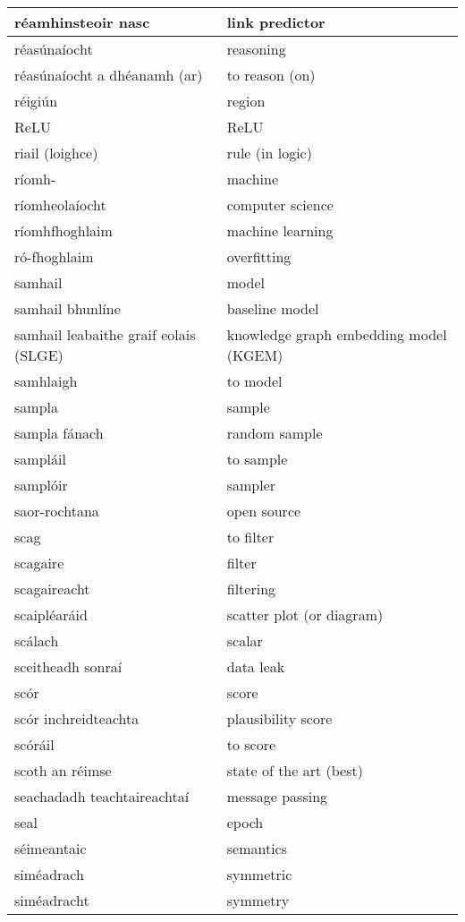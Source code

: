 \begin{longtable}{|l|l|}
		réamhinsteoir nasc&link predictor\\ \hline 
		réasúnaíocht&reasoning\\ \hline 
		réasúnaíocht a dhéanamh (ar)&to reason (on)\\ \hline 
		réigiún&region\\ \hline 
		ReLU&ReLU\\ \hline 
		riail (loighce)&rule (in logic)\\ \hline 
		ríomh-&machine\\ \hline 
		ríomheolaíocht&computer science\\ \hline 
		ríomhfhoghlaim&machine learning\\ \hline 
		ró-fhoghlaim&overfitting\\ \hline 
		samhail&model\\ \hline 
		samhail bhunlíne&baseline model\\ \hline 
		samhail leabaithe graif eolais (SLGE)&knowledge graph embedding model (KGEM)\\ \hline 
		samhlaigh&to model\\ \hline 
		sampla&sample\\ \hline 
		sampla fánach&random sample\\ \hline 
		sampláil&to sample\\ \hline 
		samplóir&sampler\\ \hline 
		saor-rochtana&open source\\ \hline 
		scag&to filter\\ \hline 
		scagaire&filter\\ \hline 
		scagaireacht&filtering\\ \hline 
		scaipléaráid&scatter plot (or diagram)\\ \hline 
		scálach&scalar\\ \hline 
		sceitheadh sonraí&data leak\\ \hline 
		scór&score\\ \hline 
		scór inchreidteachta&plausibility score\\ \hline 
		scóráil&to score\\ \hline 
		scoth an réimse&state of the art (best)\\ \hline 
		seachadadh teachtaireachtaí&message passing\\ \hline 
		seal&epoch\\ \hline 
		séimeantaic&semantics\\ \hline 
		siméadrach&symmetric\\ \hline 
		siméadracht&symmetry\\ \hline 

\end{longtable}
